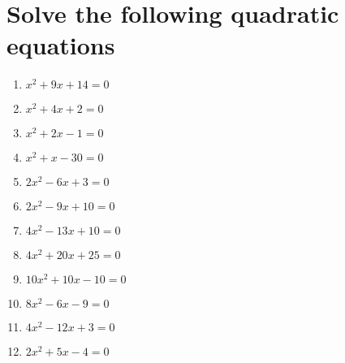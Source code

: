 \documentclass[12pt]{article}
\begin{document}
\section*{Solve the following quadratic equations}
\begin{minipage}[t]{0.45\textwidth}
    \begin{enumerate}[label=\#\arabic*]
        \setcounter{enumi}{0} %
        \item  $x^2+9x+14=0$
        \vspace{2em}
        \item  $x^2+4x+2=0$
        \vspace{2em}
        \item  $x^2+2x-1=0$
        \vspace{2em}
        \item  $x^2+x-30=0$
        \vspace{2em}
        \item  $2x^2-6x+3=0$
        \vspace{2em}
        \item  $2x^2-9x+10=0$
        \end{enumerate}
\end{minipage}%
\hspace{1cm}
\begin{minipage}[t]{0.45\textwidth}
    \begin{enumerate}[label=\#\arabic*]
        \setcounter{enumi}{6} %
        \item  $4x^2-13x+10=0$
        \vspace{2em}
        \item  $4x^2+20x+25=0$
        \vspace{2em}
        \item  $10x^2+10x-10=0$
        \vspace{2em}
        \item  $8x^2-6x-9=0$
        \vspace{2em}
        \item  $4x^2-12x+3=0$
        \vspace{2em}
        \item  $2x^2+5x-4=0$

    \end{enumerate}
\end{minipage}
\end{document}
